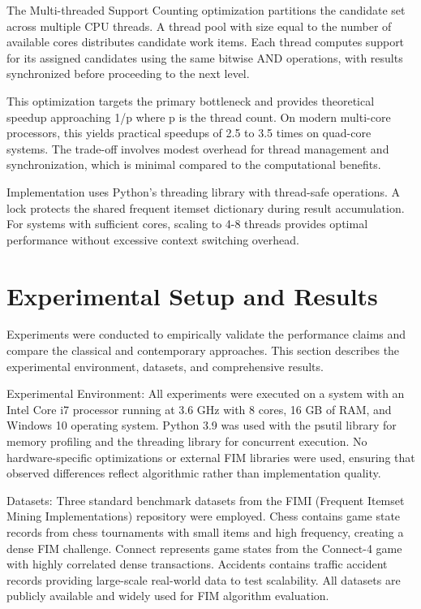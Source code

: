 \documentclass[conference]{IEEEtran}
\begin{document}
The Multi-threaded Support Counting optimization partitions the candidate set across multiple CPU threads. A thread pool with size equal to the number of available cores distributes candidate work items. Each thread computes support for its assigned candidates using the same bitwise AND operations, with results synchronized before proceeding to the next level.

This optimization targets the primary bottleneck and provides theoretical speedup approaching 1/p where p is the thread count. On modern multi-core processors, this yields practical speedups of 2.5 to 3.5 times on quad-core systems. The trade-off involves modest overhead for thread management and synchronization, which is minimal compared to the computational benefits.

Implementation uses Python's threading library with thread-safe operations. A lock protects the shared frequent itemset dictionary during result accumulation. For systems with sufficient cores, scaling to 4-8 threads provides optimal performance without excessive context switching overhead.

\section{Experimental Setup and Results}

Experiments were conducted to empirically validate the performance claims and compare the classical and contemporary approaches. This section describes the experimental environment, datasets, and comprehensive results.

Experimental Environment: All experiments were executed on a system with an Intel Core i7 processor running at 3.6 GHz with 8 cores, 16 GB of RAM, and Windows 10 operating system. Python 3.9 was used with the psutil library for memory profiling and the threading library for concurrent execution. No hardware-specific optimizations or external FIM libraries were used, ensuring that observed differences reflect algorithmic rather than implementation quality.

Datasets: Three standard benchmark datasets from the FIMI (Frequent Itemset Mining Implementations) repository were employed. Chess contains game state records from chess tournaments with small items and high frequency, creating a dense FIM challenge. Connect represents game states from the Connect-4 game with highly correlated dense transactions. Accidents contains traffic accident records providing large-scale real-world data to test scalability. All datasets are publicly available and widely used for FIM algorithm evaluation.
\end{document}
